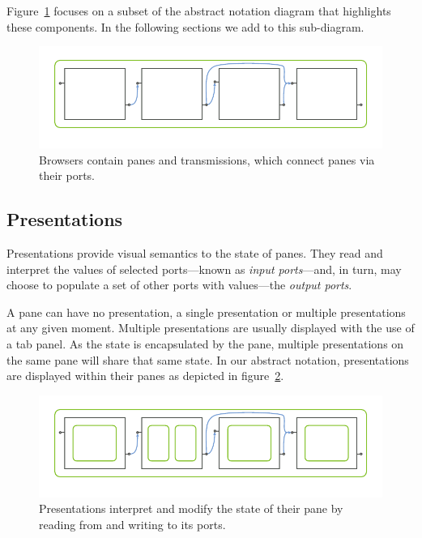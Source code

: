 \documentclass[a4paper,10pt,twoside]{book}
\begin{document}
Figure~\ref{fig:abs-browser} focuses on a subset of the abstract notation diagram that highlights these components. In the following sections we add to this sub-diagram.

\begin{figure}[htbp]
\centerline{\includegraphics[width=\linewidth]{browser.pdf}}
\caption{Browsers contain panes and transmissions, which connect panes via their ports.}
\label{fig:abs-browser}
\end{figure}



\subsection{Presentations}
\label{sec:impl/presentations}

Presentations provide visual semantics to the state of panes. They read and interpret the values of selected ports---known as \emph{input ports}---and, in turn, may choose to populate a set of other ports with values---the \emph{output ports}.

A pane can have no presentation, a single presentation or multiple presentations at any given moment. Multiple presentations are usually displayed with the use of a tab panel. As the state is encapsulated by the pane, multiple presentations on the same pane will share that same state. In our abstract notation, presentations are displayed within their panes as depicted in figure~\ref{fig:abs-presentations}.

\begin{figure}[htbp]
\centerline{\includegraphics[width=\linewidth]{presentations.pdf}}
\caption{Presentations interpret and modify the state of their pane by reading from and writing to its ports.}
\label{fig:abs-presentations}
\end{figure}
\end{document}
